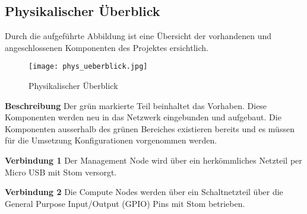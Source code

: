 \subsection{Physikalischer Überblick}
Durch die aufgeführte Abbildung ist eine Übersicht der vorhandenen und angeschlossenen Komponenten des Projektes ersichtlich.

\begin{figure}[htb]
\centering
\texttt{[image: phys\_ueberblick.jpg]}
\caption{Physikalischer Überblick}
\label{fig:Physikalischer Überblick}
\end{figure} 

\textbf{Beschreibung}\newline
Der grün markierte Teil beinhaltet das Vorhaben. Diese Komponenten werden neu in das Netzwerk eingebunden und aufgebaut. Die Komponenten ausserhalb des grünen Bereiches existieren bereits und es müssen für die Umsetzung Konfigurationen vorgenommen werden.

\textbf{Verbindung 1} \newline
Der Management Node wird über ein herkömmliches Netzteil per Micro USB mit Stom versorgt.

\textbf{Verbindung 2} \newline
Die Compute Nodes werden über ein Schaltnetzteil über die General Purpose Input/Output (GPIO) Pins mit Stom betrieben.


